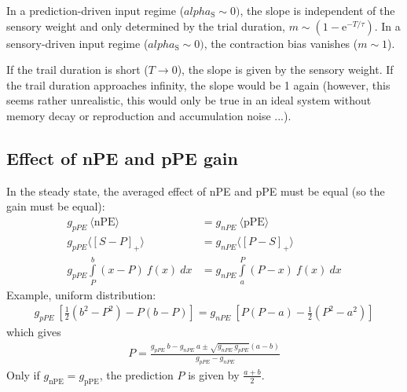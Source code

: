 \documentclass[10pt,a4paper,draft]{article}
\begin{document}
In a prediction-driven input regime ($alpha_\mathrm{S} \sim 0)$, the slope is independent of the sensory weight and only determined by the trial duration, $m \sim \left( 1 -   \mathrm{e}^{-T/\tau} \right)$. In a sensory-driven input regime ($alpha_\mathrm{S} \sim 0)$, the contraction bias vanishes ($m \sim 1$). 

If the trail duration is short ($T \rightarrow 0$), the slope is given by the sensory weight. If the trail duration approaches infinity, the slope would be 1 again (however, this seems rather unrealistic, this would only be true in an ideal system without memory decay or reproduction and accumulation noise ...).

\subsection*{Effect of nPE and pPE gain}
%
In the steady state, the averaged effect of nPE and pPE must be equal (so the gain must be equal):
%
\begin{align*}
g_{pPE}\ \langle \mathrm{nPE}\rangle &= g_{nPE}\ \langle \mathrm{pPE}\rangle \\
g_{pPE} \langle \left[ S-P\right]_+\rangle &= g_{nPE} \langle \left[ P-S\right]_+\rangle \\
g_{pPE} \int\limits_P^b \left( x-P\right)\ f(x)\ dx &= g_{nPE} \int\limits_a^P \left( P-x\right)\ f(x)\ dx
\end{align*}
%
Example, uniform distribution:
\begin{align*}
g_{pPE}\ \left[ \frac{1}{2} \left(b^2 - P^2\right) - P\left(b - P\right)\right] = g_{nPE}\ \left[  P\left(P - a\right) - \frac{1}{2} \left(P^2 - a^2\right)\right] 
\end{align*}
%
which gives
\begin{align*}
P = \frac{g_{pPE}\ b - g_{nPE}\ a \pm \sqrt{g_{nPE}\ g_{pPE}} (a-b)}{g_{pPE} - g_{nPE}}
\end{align*}
%
Only if $g_\mathrm{nPE}=g_\mathrm{pPE}$, the prediction $P$ is given by $\frac{a+b}{2}$.
\end{document}
